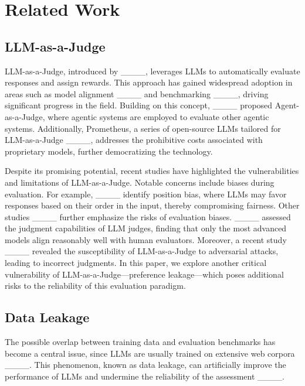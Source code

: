 \section{Related Work}
\subsection{LLM-as-a-Judge}

LLM-as-a-Judge, introduced by ____, leverages LLMs to automatically evaluate responses and assign rewards. This approach has gained widespread adoption in areas such as model alignment ____ and benchmarking ____, driving significant progress in the field. Building on this concept, ____ proposed Agent-as-a-Judge, where agentic systems are employed to evaluate other agentic systems. Additionally, Prometheus, a series of open-source LLMs tailored for LLM-as-a-Judge ____, addresses the prohibitive costs associated with proprietary models, further democratizing the technology.

Despite its promising potential, recent studies have highlighted the vulnerabilities and limitations of LLM-as-a-Judge. Notable concerns include biases during evaluation. For example, ____ identify position bias, where LLMs may favor responses based on their order in the input, thereby compromising fairness. Other studies ____ further emphasize the risks of evaluation biases. ____ assessed the judgment capabilities of LLM judges, finding that only the most advanced models align reasonably well with human evaluators. Moreover, a recent study ____ revealed the susceptibility of LLM-as-a-Judge to adversarial attacks, leading to incorrect judgments. In this paper, we explore another critical vulnerability of LLM-as-a-Judge—preference leakage—which poses additional risks to the reliability of this evaluation paradigm.




\subsection{Data Leakage}

The possible overlap between training data and evaluation benchmarks has become a central issue, since LLMs are usually trained on extensive web corpora 
____. This phenomenon, known as data leakage, can artificially improve the performance of LLMs and undermine the reliability of the assessment ____.


